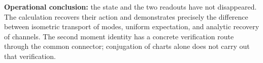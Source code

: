 \textbf{Operational conclusion:} the state and the two readouts have not disappeared. The calculation recovers their action and demonstrates precisely the difference between isometric transport of modes, uniform expectation, and analytic recovery of channels. The second moment identity has a concrete verification route through the common connector; conjugation of charts alone does not carry out that verification.
